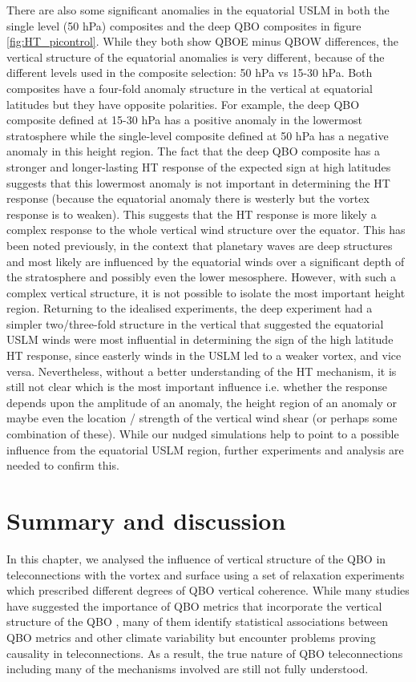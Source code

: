 There are also some significant anomalies in the equatorial USLM in both the single level (50 hPa) composites and the deep QBO composites in figure \ref{fig:HT_picontrol}. While they both show QBOE minus QBOW differences, the vertical structure of the equatorial anomalies is very different, because of the different levels used in the composite selection: 50 hPa vs 15-30 hPa. Both composites have a four-fold anomaly structure in the vertical at equatorial latitudes but they have opposite polarities. For example, the deep QBO composite defined at 15-30 hPa has a positive anomaly in the lowermost stratosphere while the single-level composite defined at 50 hPa has a negative anomaly in this height region. The fact that the deep QBO composite has a stronger and longer-lasting HT response of the expected sign at high latitudes suggests that this lowermost anomaly is not important in determining the HT response (because the equatorial anomaly there is westerly but the vortex response is to weaken). This suggests that the HT response is more likely a complex response to the whole vertical wind structure over the equator. This has been noted previously, in the context that planetary waves are deep structures and most likely are influenced by the equatorial winds over a significant depth of the stratosphere and possibly even the lower mesosphere. However, with such a complex vertical structure, it is not possible to isolate the most important height region. Returning to the idealised experiments, the deep experiment had a simpler two/three-fold structure in the vertical that suggested the equatorial USLM winds were most influential in determining the sign of the high latitude HT response, since easterly winds in the USLM led to a weaker vortex, and vice versa. Nevertheless, without a better understanding of the HT mechanism, it is still not clear which is the most important influence i.e. whether the response depends upon the amplitude of an anomaly, the height region of an anomaly or maybe even the location / strength of the vertical wind shear (or perhaps some combination of these). While our nudged simulations help to point to a possible influence from the equatorial USLM region, further experiments and analysis are needed to confirm this.

\section{Summary and discussion}
In this chapter, we analysed the influence of vertical structure of the QBO in teleconnections with the vortex and surface using a set of relaxation experiments which prescribed different degrees of QBO vertical coherence. While many studies have suggested the importance of QBO metrics that incorporate the vertical structure of the QBO \citep{schenzingerDefining2017, graySurface2018b, andrewsObserved2019d}, many of them identify statistical associations between QBO metrics and other climate variability but encounter problems proving causality in teleconnections. As a result, the true nature of QBO teleconnections including many of the mechanisms involved are still not fully understood. 

